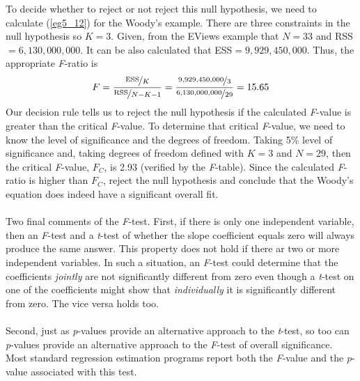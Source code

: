\documentclass[11pt]{article}
\begin{document}
To decide whether to reject or not reject this null hypothesis, we need to calculate (\ref{eg5_12}) for the Woody's example. There are three constraints in the null hypothesis so $K=3$. Given, from the EViews example that $N=33$ and RSS$=6,130,000,000$. It can be also calculated that ESS$=9,929,450,000$. Thus, the appropriate \textit{F}-ratio is
\begin{equation}
\label{eg5_14}
F=\frac{\nicefrac{\text{ESS}}{K}}{\nicefrac{\text{RSS}}{N-K-1}} = \frac{\nicefrac{9,929,450,000}{3}}{\nicefrac{6,130,000,000}{29}} = 15.65
\end{equation}
Our decision rule tells us to reject the null hypothesis if the calculated \textit{F}-value is greater than the critical \textit{F}-value. To determine that critical \textit{F}-value, we need to know the level of significance and the degrees of freedom. Taking 5\% level of significance and, taking degrees of freedom defined with $K=3$ and $N=29$, then the critical \textit{F}-value, $F_C$, is 2.93 (verified by the \textit{F}-table). Since the calculated \textit{F}-ratio is higher than $F_C$, reject the null hypothesis and conclude that the Woody's equation does indeed have a significant overall fit.\\ \\
Two final comments of the \textit{F}-test. First, if there is only one independent variable, then an \textit{F}-test and a \textit{t}-test of whether the slope coefficient equals zero will always produce the same answer. This property does not hold if there ar two or more independent variables. In such a situation, an \textit{F}-test could determine that the coefficients \textit{jointly} are not significantly different from zero even though a \textit{t}-test on one of the coefficients might show that \textit{individually} it is significantly different from zero. The vice versa holds too.\\ \\
Second, just as \textit{p}-values provide an alternative approach to the \textit{t}-test, so too can \textit{p}-values provide an alternative approach to the \textit{F}-test of overall significance. Most standard regression estimation programs report both the \textit{F}-value and the \textit{p}-value associated with this test. 
\end{document}
